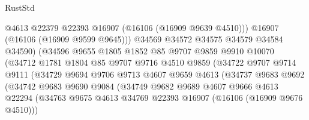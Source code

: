 \begin{lexlean}{RustStd}
\begin{coremodule}
                                  @4613
                                  @22379
                                  @22393
                                  @16907
                                  (@16106 (@16909 @9639 @4510)))
                                @16907
                                (@16106 (@16909 @9599 @9645)))
                              @34569
                              @34572
                              @34575
                              @34579
                              @34584
                              @34590)
                            (@34596
                              @9655
                              @1805
                              @1852
                              @85
                              @9707
                              @9859
                              @9910
                              @10070
                              (@34712
                                @1781
                                @1804
                                @85
                                @9707
                                @9716
                                @4510
                                @9859
                                (@34722
                                  @9707
                                  @9714
                                  @9111
                                  (@34729
                                    @9694
                                    @9706
                                    @9713
                                    @4607
                                    @9659
                                    @4613
                                    (@34737
                                      @9683
                                      @9692
                                      (@34742
                                        @9683
                                        @9690
                                        @9084
                                        (@34749
                                          @9682
                                          @9689
                                          @4607
                                          @9666
                                          @4613
                                          @22294
                                          (@34763
                                            @9675
                                            @4613
                                            @34769
                                            @22393
                                            @16907
                                            (@16106 (@16909 @9676 @4510)))

\end{coremodule}
\end{lexlean}
